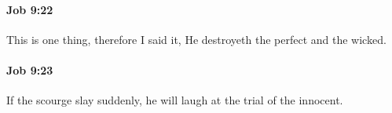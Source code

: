 		\paragraph{Job 9:22} %
			\label{JOB-9-22}

			This is one thing, therefore I said it, He destroyeth the perfect and the wicked.


		\paragraph{Job 9:23} %
			\label{JOB-9-23}

			If the scourge slay suddenly, he will laugh at the trial of the innocent.


